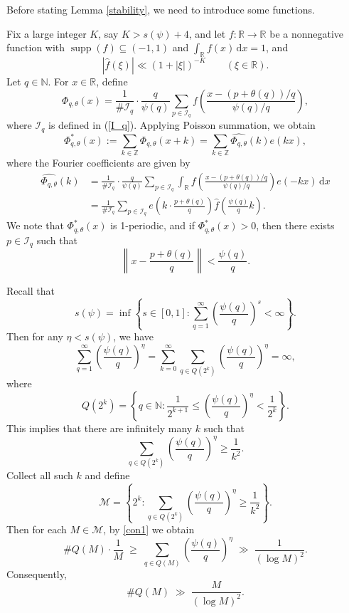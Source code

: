 \documentclass[12pt,a4paper,twoside]{article}
\begin{document}
Before stating Lemma \ref{stability}, we need to introduce some functions.

Fix a large integer \(K\), say \(K > s(\psi) + 4\), and let \(f \colon \mathbb{R} \to \mathbb{R}\) be a nonnegative function with \(\operatorname{supp}(f) \subseteq (-1,1)\) and \(\int_{\mathbb{R}} f(x) \, \mathrm{d}x = 1\), and
\begin{equation*}
   |\widehat{f}(\xi)| \ll (1 + |\xi|)^{-K} \qquad (\xi \in \mathbb{R}).
\end{equation*}
Let $q \in \mathbb{N}$. For $x \in \mathbb{R}$, define
\[
\Phi_{q,\theta}(x) = \frac{1}{\# \mathcal{I}_q} \cdot \frac{q}{\psi(q)} \sum_{p \in \mathcal{I}_q} f\!\left( \frac{x - (p+\theta(q))/q}{\psi(q)/q} \right),
\]
where $\mathcal{I}_q$ is defined in (\ref{I_q}). Applying Poisson summation, we obtain
\[
\Phi_{q,\theta}^{\ast}(x) := \sum_{k \in \mathbb{Z}} \Phi_{q,\theta}(x + k) = \sum_{k \in \mathbb{Z}} \widehat{\Phi_{q,\theta}}(k) e(kx),
\]
where the Fourier coefficients are given by
\begin{align*}
\widehat{\Phi_{q,\theta}}(k)
&= \frac{1}{\# \mathcal{I}_q} \cdot \frac{q}{\psi(q)} \sum_{p \in \mathcal{I}_q} \int_{\mathbb{R}} f\!\left( \frac{x - (p+\theta(q))/q}{\psi(q)/q} \right) e(-kx) \, \mathrm{d}x \\
&= \frac{1}{\# \mathcal{I}_q} \sum_{p \in \mathcal{I}_q} e\!\left( k \cdot \frac{p+\theta(q)}{q} \right) \widehat{f}\!\left( \frac{\psi(q)}{q} k \right).
\end{align*}
We note that  $\Phi_{q,\theta}^{\ast}(x)$ is 1-periodic, and  if $\Phi_{q,\theta}^{\ast}(x) > 0$, then there exists $p \in \mathcal{I}_q$ such that
\begin{equation}\label{positive}
    \left\| x - \frac{p+\theta(q)}{q} \right\| < \frac{\psi(q)}{q}.
\end{equation}


Recall that
\[
s(\psi) = \inf \left\{ s \in [0,1] : \sum_{q=1}^{\infty} \left( \frac{\psi(q)}{q} \right)^{\!s} < \infty \right\}.
\]
Then for any $\eta < s(\psi)$, we have
\[
\sum_{q=1}^{\infty} \left( \frac{\psi(q)}{q} \right)^{\!\eta}
= \sum_{k=0}^{\infty} \sum_{q \in Q(2^k)} \left( \frac{\psi(q)}{q} \right)^{\!\eta} = \infty,
\]
where
\[
Q(2^k) = \left\{ q \in \mathbb{N} : \frac{1}{2^{k+1}} \le \left( \frac{\psi(q)}{q} \right)^{\!\eta} < \frac{1}{2^{k}} \right\}.
\]
This implies that there are infinitely many $k$ such that
\begin{equation}\label{con1}
\sum_{q \in Q(2^k)} \left( \frac{\psi(q)}{q} \right)^{\!\eta} \ge \frac{1}{k^{2}}.
\end{equation}
Collect all such $k$ and define
\[
\mathcal{M} = \left\{ 2^{k} : \sum_{q \in Q(2^k)} \left( \frac{\psi(q)}{q} \right)^{\!\eta} \ge \frac{1}{k^{2}} \right\}.
\]
Then for each $M \in \mathcal{M}$, by \eqref{con1} we obtain
\begin{equation*}
\# Q(M) \cdot \frac{1}{M} \;\ge\; \sum_{q \in Q(M)} \left( \frac{\psi(q)}{q} \right)^{\!\eta} \;\gg\; \frac{1}{(\log M)^{2}}.
\end{equation*}
Consequently,
\begin{equation}\label{Q(M)}
\# Q(M) \;\gg\; \frac{M}{(\log M)^{2}}.
\end{equation}
\end{document}
